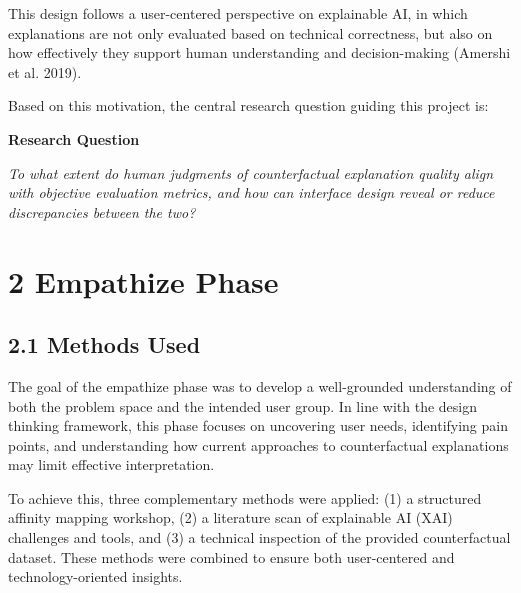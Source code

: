 \documentclass[
  letterpaper,
  DIV=11,
  numbers=noendperiod]{scrartcl}
\begin{document}
This design follows a user-centered perspective on explainable AI, in
which explanations are not only evaluated based on technical
correctness, but also on how effectively they support human
understanding and decision-making (Amershi et al. 2019).

Based on this motivation, the central research question guiding this
project is:

\begin{tcolorbox}[enhanced jigsaw, breakable, left=2mm, colback=white, arc=.35mm, toprule=.15mm, rightrule=.15mm, colframe=quarto-callout-note-color-frame, bottomrule=.15mm, opacityback=0, leftrule=.75mm]
\begin{minipage}[t]{5.5mm}
\textcolor{quarto-callout-note-color}{\faInfo}
\end{minipage}%
\begin{minipage}[t]{\textwidth - 5.5mm}

\vspace{-3mm}\textbf{Research Question}\vspace{3mm}

\emph{To what extent do human judgments of counterfactual explanation
quality align with objective evaluation metrics, and how can interface
design reveal or reduce discrepancies between the two?}

\end{minipage}%
\end{tcolorbox}

\section{2 Empathize Phase}\label{empathize-phase}

\subsection{2.1 Methods Used}\label{methods-used}

The goal of the empathize phase was to develop a well-grounded
understanding of both the problem space and the intended user group. In
line with the design thinking framework, this phase focuses on
uncovering user needs, identifying pain points, and understanding how
current approaches to counterfactual explanations may limit effective
interpretation.

To achieve this, three complementary methods were applied: (1) a
structured affinity mapping workshop, (2) a literature scan of
explainable AI (XAI) challenges and tools, and (3) a technical
inspection of the provided counterfactual dataset. These methods were
combined to ensure both user-centered and technology-oriented insights.
\end{document}
